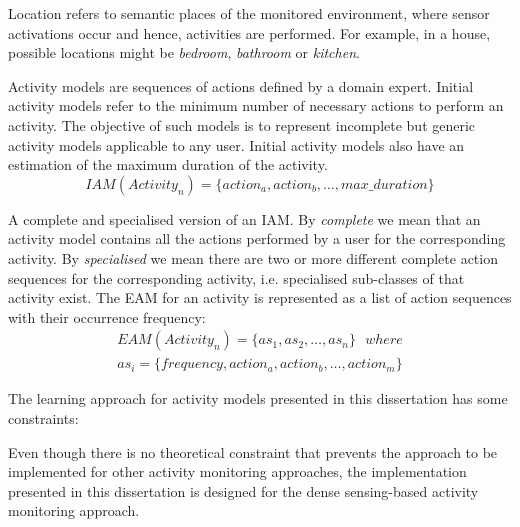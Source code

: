 \begin{defn}[Location]
\label{def-location}
 Location refers to semantic places of the monitored environment, where sensor activations occur and hence, activities are performed. For example, in a house, possible locations might be \textit{bedroom}, \textit{bathroom} or \textit{kitchen}. 
\end{defn}

\begin{defn}
\label{def-iam}
Activity models are sequences of actions defined by a domain expert. Initial activity models refer to the minimum number of necessary actions to perform an activity. The objective of such models is to represent incomplete but generic activity models applicable to any user. Initial activity models also have an estimation of the maximum duration of the activity.
\begin{equation}
  IAM(Activity_n) = \{action_a, action_b, \ldots , max\_duration\}
 \end{equation} 
\end{defn}

\begin{defn}
\label{def-eam}
 A complete and specialised version of an IAM. By \textit{complete} we mean that an activity model contains all the actions performed by a user for the corresponding activity. By \textit{specialised} we mean there are two or more different complete action sequences for the corresponding activity, i.e. specialised sub-classes of that activity exist. The EAM for an activity is represented as a list of action sequences with their occurrence frequency:
\begin{equation}
 \begin{split}
 EAM(Activity_n) = \{as_1, as_2, \ldots , as_n\} \ \ \ where \\
 as_i = \{frequency, action_a, action_b, \ldots, action_m\}
 \end{split}
 \label{eq-eam}
\end{equation}
\end{defn}

The learning approach for activity models presented in this dissertation has some constraints:

\begin{cons}
\label{cons-dense}
 Even though there is no theoretical constraint that prevents the approach to be implemented for other activity monitoring approaches, the implementation presented in this dissertation is designed for the dense sensing-based activity monitoring approach.
\end{cons}

